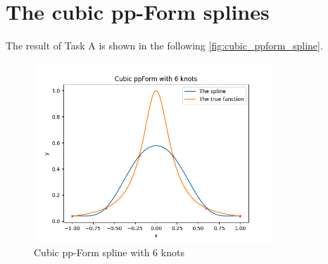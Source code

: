\documentclass[a4paper]{article}
\begin{document}
\section{The cubic pp-Form splines}

The result of Task A is shown in the following \cref{fig:cubic_ppform_spline}.
\begin{figure}[htbp]
  \centering
  \includegraphics[width = 0.8\textwidth]{../figure/Cubic ppForm with 6 knots.png}
  \caption{Cubic pp-Form spline with 6 knots}


\end{figure}
\end{document}
